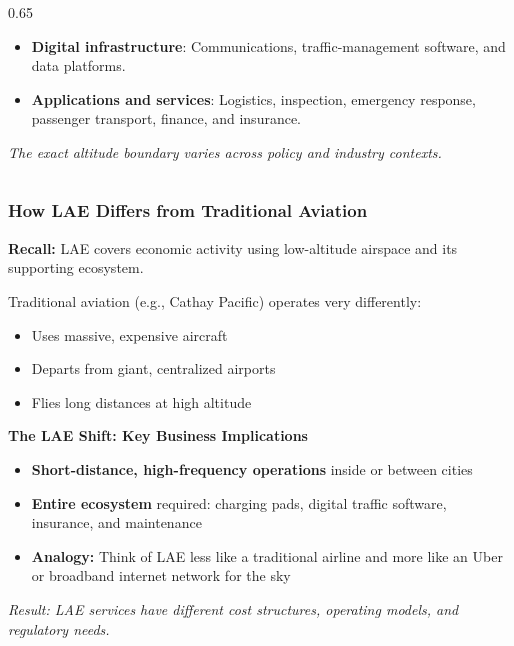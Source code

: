 \documentclass{beamer}
\begin{document}
\begin{frame}[t]
\begin{columns}[T, onlytextwidth]
\begin{column}{0.65\textwidth}
\begin{itemize}
        \item \textbf{Digital infrastructure}: Communications, traffic-management software, and data platforms.
        \item \textbf{Applications and services}: Logistics, inspection, emergency response, passenger transport, finance, and insurance.
      \end{itemize}
      \vspace{0.25cm}
      \small\textit{The exact altitude boundary varies across policy and industry contexts.}
    \end{column}
  \end{columns}
\end{frame}

\begin{frame}[t]
  \frametitle{How LAE Differs from Traditional Aviation}
 
  \textbf{Recall:} LAE covers economic activity using low-altitude airspace and its supporting ecosystem.
 
  Traditional aviation (e.g., Cathay Pacific) operates very differently:
  \begin{itemize}
    \item Uses massive, expensive aircraft
    \item Departs from giant, centralized airports
    \item Flies long distances at high altitude
  \end{itemize}
 
  \vspace{0.3cm}
  \textbf{The LAE Shift: Key Business Implications}
  \begin{itemize}
    \item \textbf{Short-distance, high-frequency operations} inside or between cities
    \item \textbf{Entire ecosystem} required: charging pads, digital traffic software, insurance, and maintenance
    \item \textbf{Analogy:} Think of LAE less like a traditional airline and more like an Uber or broadband internet network for the sky
  \end{itemize}
 
  \textit{Result: LAE services have different cost structures, operating models, and regulatory needs.}
\end{frame}
\end{document}
